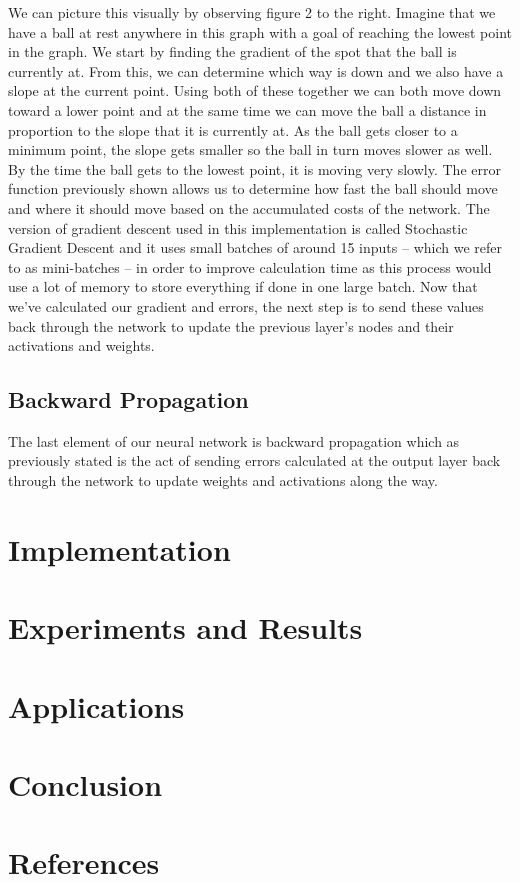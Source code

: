\documentclass[12pt]{article}
\theoremstyle{definition}
\theoremstyle{plain}
\begin{document}
We can picture this visually by observing figure 2 to the right. Imagine that we have a ball at rest anywhere in this graph with a goal of reaching the lowest point in the graph. We start by finding the gradient of the spot that the ball is currently at. From this, we can determine which way is down and we also have a slope at the current point. Using both of these together we can both move down toward a lower point and at the same time we can move the ball a distance in proportion to the slope that it is currently at. As the ball gets closer to a minimum point, the slope gets smaller so the ball in turn moves slower as well. By the time the ball gets to the lowest point, it is moving very slowly. The error function previously shown allows us to determine how fast the ball should move and where it should move based on the accumulated costs of the network. The version of gradient descent used in this implementation is called Stochastic Gradient Descent and it uses small batches of around 15 inputs \--- which we refer to as mini-batches \--- in order to improve calculation time as this process would use a lot of memory to store everything if done in one large batch. Now that we've calculated our gradient and errors, the next step is to send these values back through the network to update the previous layer's nodes and their activations and weights.

\subsection{Backward Propagation}
The last element of our neural network is backward propagation which as previously stated is the act of sending errors calculated at the output layer back through the network to update weights and activations along the way.

\section{Implementation}

\section{Experiments and Results}

\section{Applications}

\section{Conclusion}

\section*{References}
\end{document}
